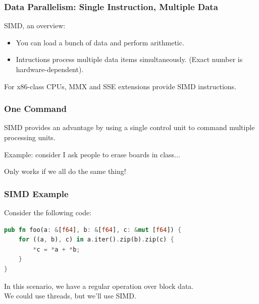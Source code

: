 \begin{frame}
  \frametitle{Data Parallelism: Single Instruction, Multiple Data}

  
   SIMD, an overview:
    \begin{itemize}
    \item You can load a bunch of data and perform 
      arithmetic.
    \item Intructions process multiple data items simultaneously.
      (Exact number is hardware-dependent).
    \end{itemize}
    For x86-class CPUs, MMX and SSE extensions provide SIMD instructions.
  
\end{frame}


\begin{frame}
\frametitle{One Command}

SIMD provides an advantage by using a single control unit to command multiple processing units.


Example: consider I ask people to erase boards in class...

Only works if we all do the same thing!

\end{frame}


\begin{frame}[fragile]
  \frametitle{SIMD Example}

  
  Consider the following code:

\begin{lstlisting}[language=Rust]
pub fn foo(a: &[f64], b: &[f64], c: &mut [f64]) {
    for ((a, b), c) in a.iter().zip(b).zip(c) {
        *c = *a + *b;
    }
}\end{lstlisting}

    In this scenario, we have a regular operation over block data.\\[1em]

    We could use threads, but we'll use SIMD.

  
\end{frame}

